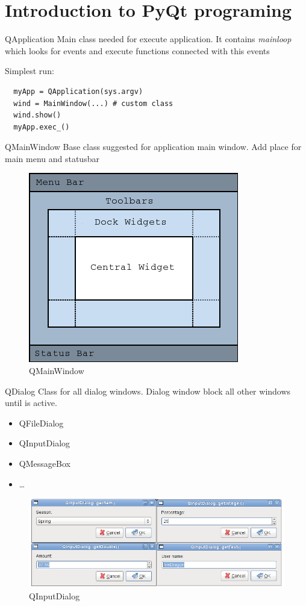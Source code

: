 \documentclass[11pt,usenames,dvipsnames]{beamer}
\begin{document}
\section{Introduction to PyQt programing}
\begin{frame}[fragile, c]{QApplication}
  Main class needed for execute application. 
  It contains \emph{mainloop} which looks for events 
  and execute functions connected with this events

  Simplest run:
  \begin{lstlisting}
  myApp = QApplication(sys.argv)
  wind = MainWindow(...) # custom class
  wind.show()
  myApp.exec_()
  \end{lstlisting}
\end{frame}
\begin{frame}[fragile, c]{QMainWindow}
  Base class suggested for application main window. 
  Add place for main menu and statusbar 
  \begin{figure}[htpb]
  \begin{center}
    \includegraphics[width=0.5\linewidth]{./mainwindowlayout.png}
  \end{center}
  \caption{QMainWindow}\label{fig:mainwindow}
  \end{figure}  
\end{frame}
\begin{frame}[c]{QDialog}
  Class for all dialog windows.
  Dialog window block all other windows until is active.

  \begin{itemize}
    \item QFileDialog
    \item QInputDialog
    \item QMessageBox
    \item \dots
  \end{itemize}
  \begin{figure}[htpb]
    \centering
    \includegraphics[width=0.8\linewidth]{./inputdialogs.png}
    \caption{QInputDialog}
    \label{fig:input}
  \end{figure}
  
\end{frame}
\end{document}
